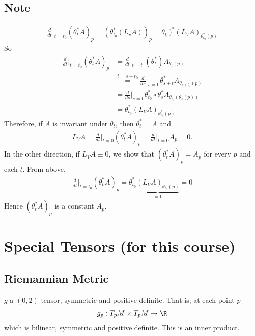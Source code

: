 \documentclass[11pt]{article}
\begin{document}
\subsection*{Note}
\label{sec:orgc9ed344}
\begin{align*}
  \frac{d}{dt}\Big|_{t=t_{0}}(\theta_{t}^{*}A)_{p}
  =(\theta_{t_{0}}^{*}(L_{v}A))_{p}
  =\theta_{t_{0}})^{*}(L_{V}A)_{\theta_{t_{0}}^{*}(p)}
\end{align*}
So\\
\begin{align*}
  \frac{d}{dt}\Big|_{t=t_{0}}(\theta_{t}^{*}A)_{p}
  &=\frac{d}{dt}\Big|_{t=t_{0}}(\theta_{t}^{*})A_{\theta_{t}(p)} \\
  &\overset{t=s+t_{0}}{=}\frac{d}{ds}\Big|_{s=0}\theta_{s+t}^{*}A_{\theta_{s+t_{0}}(p)} \\
  &=\frac{d}{ds}\Big|_{s=0}\theta_{t_{0}}^{*}\circ\theta_{s}^{*}A_{\theta_{t_{0}}(\theta_{s}(p))} \\
  &=\theta_{t_{0}}^{*}(L_{V}A)_{\theta_{t_{0}}^{*}(p)}
\end{align*}
Therefore, if \(A\) is invariant under \(\theta_{t}\), then \(\theta_{t}^{*}=A\) and\\
\begin{align*}
  L_{V}A
  =\frac{d}{dt}\Big|_{t=0}(\theta_{t}^{*}A)_{p}
  =\frac{d}{dt}\Big|_{t=0}A_{p}
  =0.
\end{align*}
In the other direction, if \(L_{V}A\equiv 0\), we show that \((\theta_{t}^{*}A)_{p}=A_{p}\) for every \(p\) and each \(t\). From above,\\
\begin{align*}
  \frac{d}{dt}\Big|_{t=t_{0}}(\theta_{t}^{*}A)_{p}
  =\theta_{t_{0}}^{*}\underbrace{(L_{V}A)_{\theta_{t_{0}}(p)}}_{=0}
  =0
\end{align*}
Hence \((\theta_{t}^{*}A)_{p}\) is a constant \(A_{p}\).\\
\section*{Special Tensors (for this course)}
\label{sec:orged9da33}
\subsection*{Riemannian Metric}
\label{sec:orga3496ba}
\(g\) a \((0,2)\)-tensor, symmetric and positive definite. That is, at each point \(p\)\\
\begin{align*}
  g_{p}:T_{p}M\times T_{p}M\to\R
\end{align*}
which is bilinear, symmetric and positive definite. This is an inner product.\\
\end{document}
